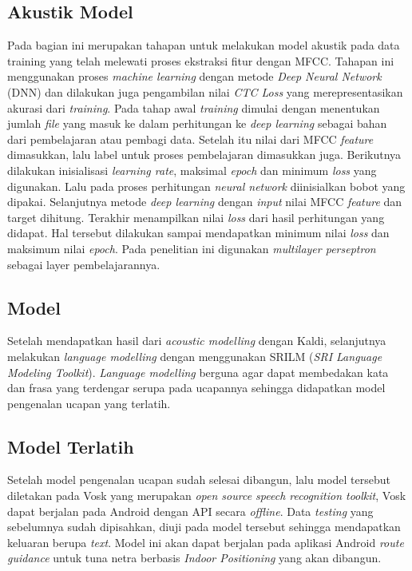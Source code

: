 \subsection{Akustik Model}
Pada bagian ini merupakan tahapan untuk melakukan model akustik pada data training yang telah melewati proses ekstraksi fitur dengan MFCC. Tahapan ini menggunakan proses \textit{machine learning} dengan metode \textit{Deep Neural Network} (DNN) dan dilakukan juga pengambilan nilai \textit{CTC Loss} yang merepresentasikan akurasi dari \textit{training}. Pada tahap awal \textit{training} dimulai dengan menentukan jumlah \textit{file} yang masuk ke dalam perhitungan ke \textit{deep learning} sebagai bahan dari pembelajaran atau pembagi data. Setelah itu nilai dari MFCC \textit{feature} dimasukkan, lalu label untuk proses pembelajaran dimasukkan juga. Berikutnya dilakukan inisialisasi \textit{learning rate}, maksimal \textit{epoch} dan minimum \textit{loss} yang digunakan. Lalu pada proses perhitungan \textit{neural network} diinisialkan bobot yang dipakai. Selanjutnya metode \textit{deep learning} dengan \textit{input} nilai MFCC \textit{feature} dan target dihitung. Terakhir menampilkan nilai \textit{loss} dari hasil perhitungan yang didapat. Hal tersebut dilakukan sampai mendapatkan minimum nilai \textit{loss} dan maksimum nilai \textit{epoch}. Pada penelitian ini digunakan \textit{multilayer perseptron} sebagai layer pembelajarannya. 

\subsection{Model}
Setelah mendapatkan hasil dari \textit{acoustic modelling} dengan Kaldi, selanjutnya melakukan \textit{language modelling} dengan menggunakan SRILM (\textit{SRI Language Modeling Toolkit}). \textit{Language modelling} berguna agar dapat membedakan kata dan frasa yang terdengar serupa pada ucapannya sehingga didapatkan model pengenalan ucapan yang terlatih. 

\subsection{Model Terlatih}
Setelah model pengenalan ucapan sudah selesai dibangun, lalu model tersebut diletakan pada Vosk yang merupakan \textit{open source speech recognition toolkit}, Vosk dapat berjalan pada Android dengan API secara \textit{offline}. Data \textit{testing} yang sebelumnya sudah dipisahkan, diuji pada model tersebut sehingga mendapatkan keluaran berupa \textit{text}. Model ini akan dapat berjalan pada aplikasi Android \textit{route guidance} untuk tuna netra berbasis \textit{Indoor Positioning} yang akan dibangun.


